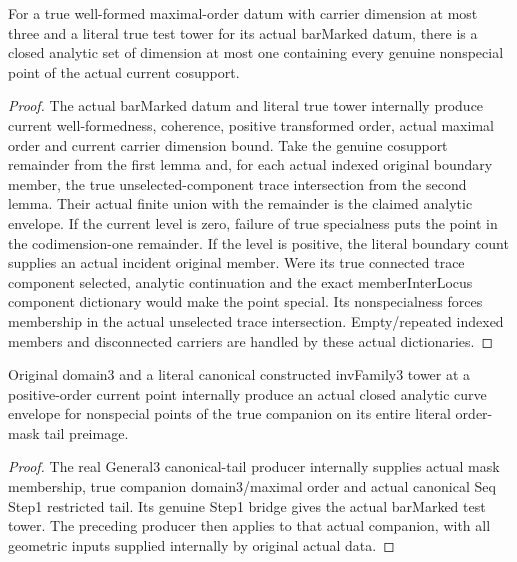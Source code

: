 \begin{theorem}
\label{hir:dimension-three-actual-nonspecial-curve-envelope}
\leanok
For a true well-formed maximal-order datum with carrier dimension at most three
and a literal true test tower for its actual barMarked datum, there is a closed
analytic set of dimension at most one containing every genuine nonspecial
point of the actual current cosupport.
\end{theorem}
\begin{proof}
The actual barMarked datum and literal true tower internally produce current
well-formedness, coherence, positive transformed order, actual maximal order
and current carrier dimension bound. Take the genuine cosupport remainder
from the first lemma and, for each actual indexed original boundary member,
the true unselected-component trace intersection from the second lemma.
Their actual finite union with the remainder is the claimed analytic envelope.
If the current level is zero, failure of true specialness puts the point in
the codimension-one remainder. If the level is positive, the literal boundary
count supplies an actual incident original member. Were its true connected
trace component selected, analytic continuation and the exact memberInterLocus
component dictionary would make the point special. Its nonspecialness forces
membership in the actual unselected trace intersection. Empty/repeated indexed
members and disconnected carriers are handled by these actual dictionaries.
\end{proof}

\begin{theorem}
\label{hir:dimension-three-actual-general-companion-curve-envelope}
\leanok
Original domain3 and a literal canonical constructed invFamily3 tower at a
positive-order current point internally produce an actual closed analytic
curve envelope for nonspecial points of the true companion on its entire
literal order-mask tail preimage.
\end{theorem}
\begin{proof}
The real General3 canonical-tail producer internally supplies actual mask
membership, true companion domain3/maximal order and actual canonical Seq
Step1 restricted tail. Its genuine Step1 bridge gives the actual barMarked
test tower. The preceding producer then applies to that actual companion,
with all geometric inputs supplied internally by original actual data.
\end{proof}

